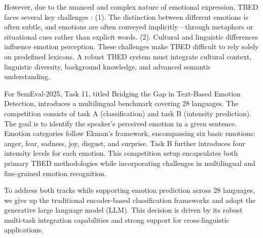 \documentclass[11pt]{article}
\begin{document}
However, due to the nuanced and complex nature of emotional expression, TBED faces several key challenges \cite{al2024challenges}: (1). The distinction between different emotions is often subtle, and emotions are often conveyed implicitly—through metaphors or situational cues rather than explicit words. (2). Cultural and linguistic differences influence emotion perception. These challenges make TBED difficult to rely solely on predefined lexicons. A robust TBED system must integrate cultural context, linguistic diversity, background knowledge, and advanced semantic understanding.


For SemEval-2025, Task 11, titled Bridging the Gap in Text-Based Emotion Detection, introduces a multilingual benchmark covering 28 languages. The competition consists of task A (classification) and task B (intensity prediction). The goal is to identify the speaker's perceived emotion in a given sentence. Emotion categories follow Ekman's framework\cite{ekman1969repertoire}, encompassing six basic emotions: anger, fear, sadness, joy, disgust, and surprise. Task B further introduces four intensity levels for each emotion. This competition setup encapsulates both primary TBED methodologies while incorporating challenges in multilingual and fine-grained emotion recognition. 


To address both tracks while supporting emotion prediction across 28 languages, we give up the traditional encoder-based classification frameworks and adopt the generative large language model (LLM). This decision is driven by its robust multi-task integration capabilities and strong support for cross-linguistic applications.
\end{document}
